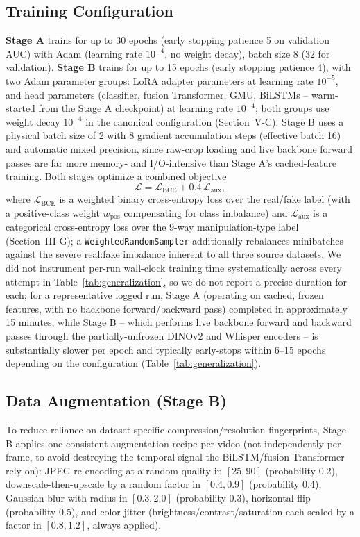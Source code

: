 \documentclass[conference]{IEEEtran}
\begin{document}
\subsection{Training Configuration}
\textbf{Stage A} trains for up to 30 epochs (early stopping patience 5 on
validation AUC) with Adam (learning rate $10^{-4}$, no weight decay), batch
size 8 (32 for validation). \textbf{Stage B} trains for up to 15 epochs
(early stopping patience 4), with two Adam parameter groups: LoRA adapter
parameters at learning rate $10^{-5}$, and head parameters (classifier,
fusion Transformer, GMU, BiLSTMs -- warm-started from the Stage A
checkpoint) at learning rate $10^{-4}$; both groups use weight decay
$10^{-4}$ in the canonical configuration (Section~V-C). Stage B uses a
physical batch size of 2 with 8 gradient accumulation steps (effective
batch 16) and automatic mixed precision, since raw-crop loading and live
backbone forward passes are far more memory- and I/O-intensive than
Stage A's cached-feature training. Both stages optimize a combined
objective
\begin{equation}
\mathcal{L} = \mathcal{L}_{\mathrm{BCE}} + 0.4\,\mathcal{L}_{\mathrm{aux}},
\end{equation}
where $\mathcal{L}_{\mathrm{BCE}}$ is a weighted binary cross-entropy loss
over the real/fake label (with a positive-class weight $w_{\mathrm{pos}}$
compensating for class imbalance) and $\mathcal{L}_{\mathrm{aux}}$ is a
categorical cross-entropy loss over the 9-way manipulation-type label
(Section~III-G); a \texttt{WeightedRandomSampler} additionally rebalances
minibatches against the severe real:fake imbalance inherent to all three
source datasets. We did not instrument per-run wall-clock training time
systematically across every attempt in Table~\ref{tab:generalization}, so
we do not report a precise duration for each; for a representative logged
run, Stage A (operating on cached, frozen features, with no backbone
forward/backward pass) completed in approximately 15 minutes, while Stage
B -- which performs live backbone forward and backward passes through the
partially-unfrozen DINOv2 and Whisper encoders -- is substantially slower
per epoch and typically early-stops within 6--15 epochs depending on the
configuration (Table~\ref{tab:generalization}).

\subsection{Data Augmentation (Stage B)}
To reduce reliance on dataset-specific compression/resolution fingerprints,
Stage B applies one consistent augmentation recipe per video (not
independently per frame, to avoid destroying the temporal signal the
BiLSTM/fusion Transformer rely on): JPEG re-encoding at a random quality in
$[25,90]$ (probability 0.2), downscale-then-upscale by a random factor in
$[0.4,0.9]$ (probability 0.4), Gaussian blur with radius in $[0.3,2.0]$
(probability 0.3), horizontal flip (probability 0.5), and color jitter
(brightness/contrast/saturation each scaled by a factor in $[0.8,1.2]$,
always applied).
\end{document}
